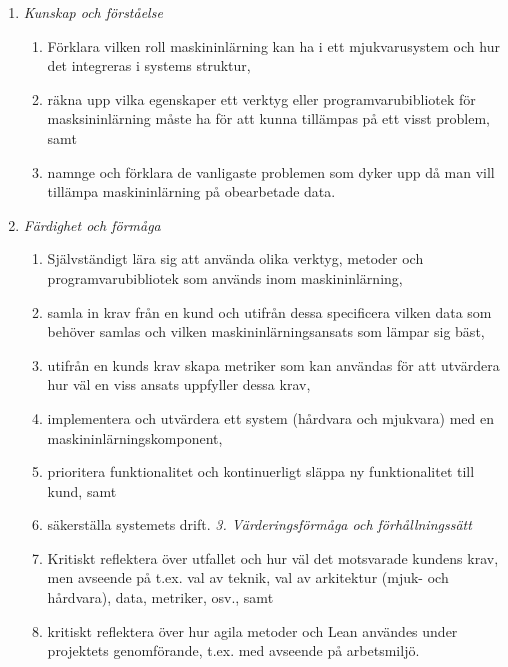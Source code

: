 \begin{enumerate}
\def\labelenumi{\Alph{enumi}.}
\tightlist
\item
  \emph{Kunskap och förståelse}

  \begin{enumerate}
  \def\labelenumii{\Alph{enumi}.\arabic{enumii}.}
  \tightlist
  \item
    Förklara vilken roll maskininlärning kan ha i ett mjukvarusystem och
    hur det integreras i systems struktur,
  \item
    räkna upp vilka egenskaper ett verktyg eller programvarubibliotek
    för masksininlärning måste ha för att kunna tillämpas på ett visst
    problem, samt
  \item
    namnge och förklara de vanligaste problemen som dyker upp då man
    vill tillämpa maskininlärning på obearbetade data.
  \end{enumerate}
\item
  \emph{Färdighet och förmåga}

  \begin{enumerate}
  \def\labelenumii{\Alph{enumi}.\arabic{enumii}.}
  \tightlist
  \item
    Självständigt lära sig att använda olika verktyg, metoder och
    programvarubibliotek som används inom maskininlärning,
  \item
    samla in krav från en kund och utifrån dessa specificera vilken data
    som behöver samlas och vilken maskininlärningsansats som lämpar sig
    bäst,
  \item
    utifrån en kunds krav skapa metriker som kan användas för att
    utvärdera hur väl en viss ansats uppfyller dessa krav,
  \item
    implementera och utvärdera ett system (hårdvara och mjukvara) med en
    maskininlärningskomponent,
  \item
    prioritera funktionalitet och kontinuerligt släppa ny funktionalitet
    till kund, samt
  \item
    säkerställa systemets drift. \emph{3. Värderingsförmåga och
    förhållningssätt}
  \item
    Kritiskt reflektera över utfallet och hur väl det motsvarade kundens
    krav, men avseende på t.ex. val av teknik, val av arkitektur (mjuk-
    och hårdvara), data, metriker, osv., samt
  \item
    kritiskt reflektera över hur agila metoder och Lean användes under
    projektets genomförande, t.ex. med avseende på arbetsmiljö.
  \end{enumerate}
\end{enumerate}

